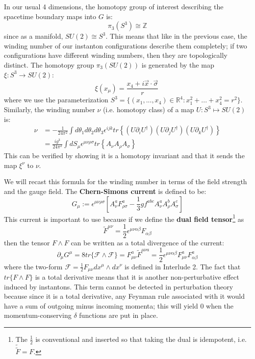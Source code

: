 \documentclass[11pt, oneside]{article}   	%
\theoremstyle{definition}
\begin{document}
In our usual 4 dimensions, the homotopy group of interest describing the spacetime boundary maps into $G$ is:
\begin{equation}
	\pi_3(S^3)\cong\mathbb Z
\end{equation}
since as a manifold, $SU(2)\cong S^3$. This means that like in the previous case, the winding number of our instanton 
configurations describe them completely; if two configurations have different winding numbers, then they are topologically 
distinct. The homotopy group $\pi_3(SU(2))$ is generated by the map $\xi : S^3\rightarrow SU(2)$:
\begin{equation}
	\xi(x_\mu) = \frac{x_4 + i \vec x\cdot \vec\sigma}{r}~
	\label{eq:pi3_su2_generator}
\end{equation}
where we use the parameterization $S^3 = \{(x_1, ..., x_4)\in\mathbb R^4 : x_1^2 + ... + x_4^2 = r^2\}$. Similarly, the winding number 
$\nu$ (i.e. homotopy class) of a map $U : S^3\mapsto SU(2)$ is:
\begin{align}
	\nu &= -\frac{1}{24\pi^2} \int d\theta_1 d\theta_2 d\theta_3 \epsilon^{ijk}tr\left\{(U \partial_i U^\dagger) (U\partial_j U^\dagger) (U\partial_k U^\dagger)\right\} \\
	&= \frac{ig^3}{24\pi^2} \int dS_\mu \epsilon^{\mu\nu\rho\sigma}tr\left\{A_\nu A_\rho A_\sigma\right\}
\end{align}
This can be verified by showing it is a homotopy invariant and that it sends the map $\xi^\nu$ to $\nu$. 

We will recast this formula for the winding number in terms of the field strength and the gauge field. The \textbf{Chern-Simons current} is defined 
to be:
\begin{equation}
	G_\mu := \epsilon^{\mu\nu\rho\sigma} \left[A_\nu^a F_{\rho\sigma}^a - \frac{1}{3}g f^{abc} A_\nu^a A_\rho^b A_\sigma^c\right]
\end{equation}
This current is important to use because if we define the \textbf{dual field tensor}\footnote{The $\frac{1}{2}$ is conventional and inserted so 
that taking the dual is idempotent, i.e. $\tilde{\tilde F} = F$. } as
\begin{equation}
	\tilde F^{\mu\nu} = \frac{1}{2} \epsilon^{\mu\nu\alpha\beta} F_{\alpha\beta}
\end{equation}
then the tensor $F\wedge F$ can be written as a total divergence of the current:
\begin{equation}
	\partial_\mu G^\mu = 8 tr\{\mathcal F \wedge \mathcal F\} = F_{\mu\nu}^a\tilde F^{\mu\nu a} = \frac{1}{2} \epsilon^{\mu\nu\alpha\beta} F_{\mu\nu}^a F_{\alpha\beta}^a
\end{equation}
where the two-form $\mathcal F = \frac{1}{2} F_{\mu\nu} dx^\mu\wedge dx^\nu$ is defined in Interlude 2. The fact that $tr\{F\wedge F\}$ is a 
total derivative means that it is another non-perturbative effect induced by instantons. This term cannot be detected in perturbation theory 
because since it is a total derivative, any Feynman rule associated with it would have a sum of outgoing minus incoming momenta; this 
will yield 0 when the momentum-conserving $\delta$ functions are put in place. 
\end{document}
